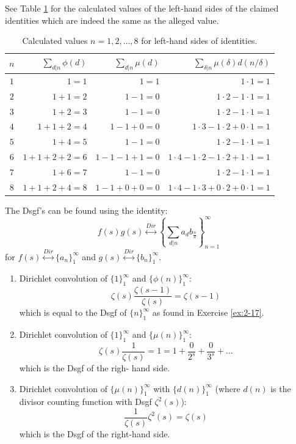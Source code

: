 \begin{solution}
    See Table \ref{tab:2:ex:2-18} for the calculated values of the left-hand sides of the claimed identities which are indeed the same as the alleged value.
    \begin{table}[hbpt]
        \centering
        \caption{Calculated values $n=1,2,\ldots,8$ for left-hand sides of identities.}
        \label{tab:2:ex:2-18}
        \begin{tabular}{@{}crrr@{}}
            \toprule 
            $n$ & $\sum_{d\vert n} \phi(d)$ & $\sum_{d\vert n} \mu(d)$ & $\sum_{\delta\vert n} \mu(\delta)d(n/\delta)$ \\ \midrule
            $1$ & $1 = 1$ & $1 = 1$ & $1\cdot 1 = 1$ \\
            $2$ & $1 + 1 = 2$ & $1 - 1 = 0$ & $1\cdot 2 - 1 \cdot 1 = 1$ \\
            $3$ & $1 + 2 = 3$ & $1 - 1 = 0$ & $1 \cdot 2 - 1 \cdot 1 = 1$ \\
            $4$ & $1 + 1 + 2 = 4$ & $ 1 - 1 + 0 = 0$ &  $1\cdot 3-1\cdot2+0\cdot 1=1$ \\
            $5$ & $1+ 4 = 5$& $1 - 1 =0$ &$1\cdot 2 - 1\cdot 1 = 1$ \\
            $6$ & $1+1+2+2 = 6$& $1-1-1+1=0$& $1 \cdot 4 - 1\cdot 2 -1\cdot 2 + 1\cdot 1 = 1$ \\
            $7$ & $1+6=7$&$1-1=0$ & $1\cdot 2 - 1 \cdot 1 = 1$\\
            $8$ & $1+1+2+4=8$ &$1-1+0+0=0$ & $1\cdot 4 - 1 \cdot 3 + 0 \cdot 2 + 0\cdot 1 = 1$\\
            \bottomrule
        \end{tabular}
    \end{table}

    The Dsgf's can be found using the identity:
    \[
        f(s) g(s) \stackrel{Dir}{\longleftrightarrow} \left\{\sum_{d\vert n}a_db_{\frac{n}{d}}\right\}_{n=1}^\infty
    \]
    for $f(s) \stackrel{Dir}{\longleftrightarrow} \{a_n\}_1^\infty$ and $g(s) \stackrel{Dir}{\longleftrightarrow} \{b_n\}_1^\infty$.
    \begin{enumerate}[label=(\alph*)]
        \item Dirichlet convolution of $\{1\}_1^\infty$ and $\{\phi(n)\}_1^\infty$:
        \[
            \zeta(s) \frac{\zeta(s-1)}{\zeta(s)} = \zeta(s-1)
        \]
        which is equal to the Dsgf of $\{n\}_1^\infty$ as found in Exercise \ref{ex:2-17}.
        \item Dirichlet convolution of $\{1\}_1^\infty$ and $\{\mu(n)\}_1^\infty$:
        \[
            \zeta(s) \frac{1}{\zeta(s)} = 1 = 1 + \frac{0}{2^s} + \frac{0}{3^s} + \ldots
        \]
        which is the Dsgf of the righ- hand side.
        \item Dirichlet convolution of $\{\mu(n)\}_1^\infty$ with $\{d(n)\}_1^\infty$ (where $d(n)$ is the divisor counting function with Dsgf $\zeta^2(s)$):
        \[
            \frac{1}{\zeta(s)} \zeta^2(s) = \zeta(s)
        \]
        which is the Dsgf of the right-hand side.
    \end{enumerate}
\end{solution}

